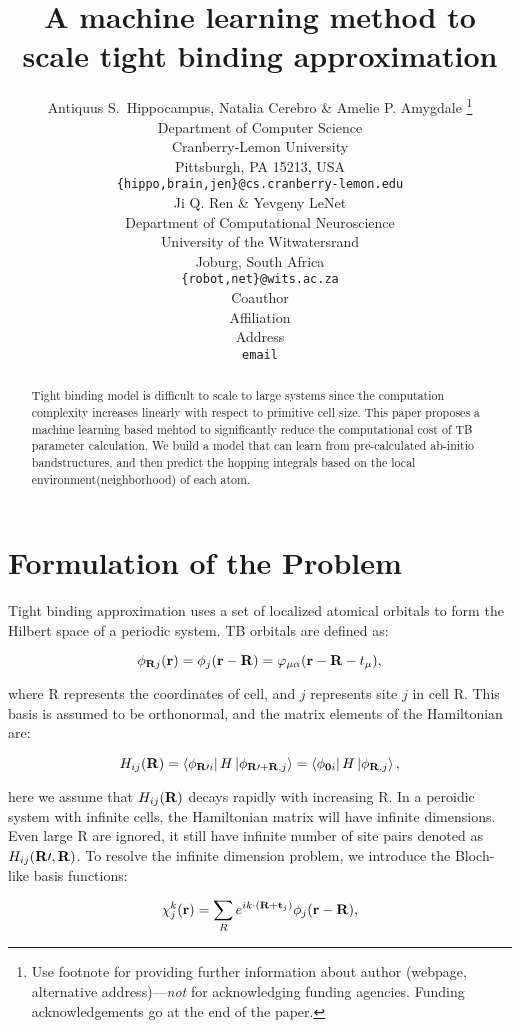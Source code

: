 \documentclass{article} %
\title{A machine learning method to scale tight binding approximation}
\author{Antiquus S.~Hippocampus, Natalia Cerebro \& Amelie P. Amygdale \thanks{ Use footnote for providing further information
about author (webpage, alternative address)---\emph{not} for acknowledging
funding agencies.  Funding acknowledgements go at the end of the paper.} \\
Department of Computer Science\\
Cranberry-Lemon University\\
Pittsburgh, PA 15213, USA \\
\texttt{\{hippo,brain,jen\}@cs.cranberry-lemon.edu} \\
\And
Ji Q. Ren \& Yevgeny LeNet \\
Department of Computational Neuroscience \\
University of the Witwatersrand \\
Joburg, South Africa \\
\texttt{\{robot,net\}@wits.ac.za} \\
\AND
Coauthor \\
Affiliation \\
Address \\
\texttt{email}
}
\begin{document}
\maketitle

\begin{abstract}
Tight binding model is difficult to scale to large systems since the computation complexity
increases linearly with respect to primitive cell size. This paper proposes a machine learning
based mehtod to significantly reduce the computational cost of TB parameter calculation.
We build a model that can learn from pre-calculated ab-initio bandstructures, and then predict
the hopping integrals based on the local environment(neighborhood) of each atom.
\end{abstract}

\section{Formulation of the Problem}

Tight binding approximation uses a set of localized atomical orbitals to form the Hilbert space
of a periodic system. TB orbitals are defined as:

\begin{equation}
\phi_{\bold{R}j}(\bold{r}) = \phi_j(\bold{r}-\bold{R}) 
= \varphi_{\mu\alpha}(\bold{r}-\bold{R}-t_{\mu}),
\end{equation}

where R represents the coordinates of cell, and $j$ represents site $j$ in cell R.
This basis is assumed to be orthonormal, and the matrix elements of the Hamiltonian are:

\begin{equation}
H_{ij}(\bold{R}) = \bra{\phi_{\bold{R\prime}i}}H\ket{\phi_{\bold{R\prime}+\bold{R},j}}
= \bra{\phi_{\bold{0}i}}H\ket{\phi_{\bold{R},j}},
\end{equation}

here we assume that $H_{ij}(\bold{R})$ decays rapidly with increasing R. In a peroidic system with
infinite cells, the Hamiltonian matrix will have infinite dimensions. Even large R are ignored, it still
have infinite number of site pairs denoted as $H_{ij}(\bold{R\prime}, \bold{R})$. To resolve
the infinite dimension problem, we introduce the Bloch-like basis functions:

\begin{equation}
\chi^k_j(\bold{r})=\sum_R e^{ik\cdot(\bold{R}+\bold{t}_j)}\phi_j(\bold{r}-\bold{R}),
\end{equation}
\end{document}
